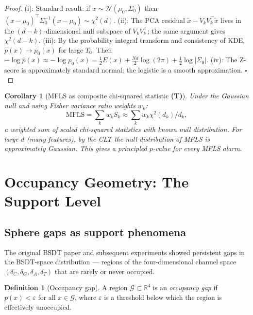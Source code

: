 \documentclass[11pt,a4paper]{article}
\newtheorem{corollary}[theorem]{Corollary}
\theoremstyle{definition}
\newtheorem{definition}[theorem]{Definition}
\newcommand{\R}{\mathbb{R}}
\begin{document}
\begin{proof}
(i): Standard result: if $x \sim \mathcal{N}(\mu_0,\Sigma_0)$ then
$(x-\mu_0)^\top\Sigma_0^{-1}(x-\mu_0) \sim \chi^2(d)$.
(ii): The PCA residual $\tilde x - V_kV_k^\top\tilde x$ lives in the $(d-k)$-dimensional
null subspace of $V_kV_k^\top$; the same argument gives $\chi^2(d-k)$.
(iii): By the probability integral transform and consistency of KDE,
$\hat p(x) \to p_0(x)$ for large $T_0$. Then
$-\log\hat p(x) \approx -\log p_0(x) = \tfrac{1}{2}E(x) + \tfrac{Nd}{2}\log(2\pi) + \tfrac{1}{2}\log|\Sigma_0|$.
(iv): The Z-score is approximately standard normal; the logistic is a smooth approximation. $\square$
\end{proof}

\begin{corollary}[MFLS as composite chi-squared statistic \textbf{(T)}]
Under the Gaussian null and using Fisher variance ratio weights $w_k$:
\[
\mathrm{MFLS} = \sum_k w_k S_k \approx \sum_k w_k\chi^2(d_k)/d_k,
\]
a weighted sum of scaled chi-squared statistics with known null distribution.
For large $d$ (many features), by the CLT the null distribution of MFLS is
approximately Gaussian. This gives a principled $p$-value for every MFLS alarm.
\end{corollary}

\section{Occupancy Geometry: The Support Level}
\label{sec:support}

\subsection{Sphere gaps as support phenomena}

The original BSDT paper and subsequent experiments showed persistent gaps in the
BSDT-space distribution --- regions of the four-dimensional channel space
$(\delta_C, \delta_G, \delta_A, \delta_T)$ that are rarely or never occupied.

\begin{definition}[Occupancy gap]
A region $\mathcal{G} \subset \R^4$ is an \emph{occupancy gap} if
$p(x) < \varepsilon$ for all $x \in \mathcal{G}$, where $\varepsilon$ is a
threshold below which the region is effectively unoccupied.
\end{definition}
\end{document}
